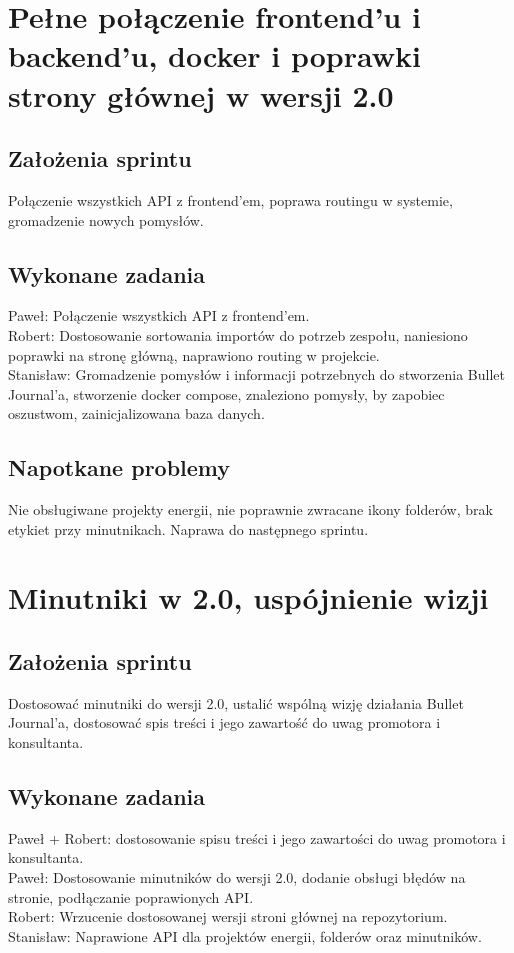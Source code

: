 \documentclass[a4paper,11pt]{report}
\begin{document}
\section {Pełne połączenie frontend'u i backend'u, docker i poprawki strony głównej w wersji 2.0}
\subsection {Założenia sprintu}
Połączenie wszystkich API z frontend'em, poprawa routingu w systemie, gromadzenie nowych pomysłów.
\subsection {Wykonane zadania}
Paweł: Połączenie wszystkich API z frontend'em.\\
Robert:  Dostosowanie sortowania importów do potrzeb zespołu, naniesiono poprawki na stronę główną, naprawiono routing w projekcie.\\ 
Stanisław: Gromadzenie pomysłów i informacji potrzebnych do stworzenia Bullet Journal'a, stworzenie docker compose, znaleziono pomysły, by zapobiec oszustwom, zainicjalizowana baza danych.\\ 
\subsection {Napotkane problemy}
Nie obsługiwane projekty energii, nie poprawnie zwracane ikony folderów, brak etykiet przy minutnikach. Naprawa do następnego sprintu.

\section {Minutniki w 2.0, uspójnienie wizji}
\subsection {Założenia sprintu}
Dostosować minutniki do wersji 2.0, ustalić wspólną wizję działania Bullet Journal'a, dostosować spis treści i jego zawartość do uwag promotora i konsultanta.
\subsection {Wykonane zadania}
Paweł + Robert: dostosowanie spisu treści i jego zawartości do uwag promotora i konsultanta.\\
Paweł: Dostosowanie minutników do wersji 2.0, dodanie obsługi błędów na stronie, podłączanie poprawionych API.\\
Robert:  Wrzucenie dostosowanej wersji stroni głównej na repozytorium.\\
Stanisław: Naprawione API dla projektów energii, folderów oraz minutników.\\
\end{document}
